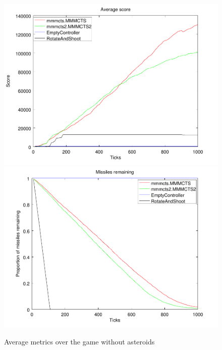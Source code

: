 \begin{figure}
	\caption{Average metrics over the game without asteroids}
	\center
	\includegraphics[scale=0.25]{resources/score_2.pdf}
	\includegraphics[scale=0.25]{resources/missiles_2.pdf}
\end{figure}

